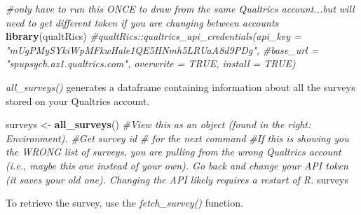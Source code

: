 \documentclass[
  english,
]{book}
\newenvironment{Shaded}{\begin{snugshade}}{\end{snugshade}}
\newcommand{\CommentTok}[1]{\textcolor[rgb]{0.56,0.35,0.01}{\textit{#1}}}
\newcommand{\KeywordTok}[1]{\textcolor[rgb]{0.13,0.29,0.53}{\textbf{#1}}}
\newcommand{\NormalTok}[1]{#1}
\newcommand{\StringTok}[1]{\textcolor[rgb]{0.31,0.60,0.02}{#1}}
\begin{document}
\begin{Shaded}
\begin{Highlighting}[]
\CommentTok{#only have to run this ONCE to draw from the same Qualtrics account...but will need to get different token if you are changing between accounts }
\KeywordTok{library}\NormalTok{(qualtRics)}
\CommentTok{#qualtRics::qualtrics_api_credentials(api_key = "mUgPMySYkiWpMFkwHale1QE5HNmh5LRUaA8d9PDg",}
              \CommentTok{#base_url = "spupsych.az1.qualtrics.com", overwrite = TRUE, install = TRUE)}
\end{Highlighting}
\end{Shaded}

\emph{all\_surveys()} generates a dataframe containing information about all the surveys stored on your Qualtrics account.

\begin{Shaded}
\begin{Highlighting}[]
\NormalTok{surveys <-}\StringTok{ }\KeywordTok{all_surveys}\NormalTok{() }
\CommentTok{#View this as an object (found in the right: Environment).  }
\CommentTok{#Get survey id # for the next command}
\CommentTok{#If this is showing you the WRONG list of surveys, you are pulling from the wrong Qualtrics account (i.e., maybe this one instead of your own). Go back and change your API token (it saves your old one). Changing the API likely requires a restart of R.}
\NormalTok{surveys}
\end{Highlighting}
\end{Shaded}

To retrieve the survey, use the \emph{fetch\_survey()} function.
\end{document}
